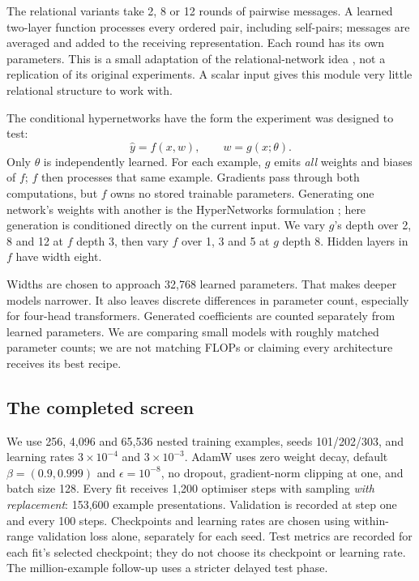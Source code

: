 \documentclass{article}
\begin{document}
The relational variants take 2, 8 or 12 rounds of pairwise messages. A learned
two-layer function processes every ordered pair, including self-pairs; messages
are averaged and added to the receiving representation. Each round has its own
parameters. This is a small adaptation of the relational-network idea
\cite{relational}, not a replication of its original experiments. A scalar input
gives this module very little relational structure to work with.

The conditional hypernetworks have the form the experiment was designed to test:
\[
  \hat y=f(x,w),\qquad w=g(x;\theta).
\]
Only $\theta$ is independently learned. For each example, $g$ emits \emph{all}
weights and biases of $f$; $f$ then processes that same example. Gradients pass
through both computations, but $f$ owns no stored trainable parameters. Generating one network's
weights with another is the HyperNetworks formulation \cite{hyper}; here generation
is conditioned directly on the current input.
We vary $g$'s depth over 2, 8 and 12 at $f$ depth 3, then vary $f$ over 1, 3 and 5
at $g$ depth 8. Hidden layers in $f$ have width eight.

Widths are chosen to approach 32,768 learned parameters. That makes deeper models
narrower. It also leaves discrete differences in parameter count, especially for
four-head transformers. Generated coefficients are counted separately from learned
parameters. We are comparing small models with roughly matched parameter counts;
we are not matching FLOPs or claiming every architecture receives its best recipe.

\subsection{The completed screen}
We use 256, 4,096 and 65,536 nested training examples, seeds 101/202/303, and learning
rates $3\times10^{-4}$ and $3\times10^{-3}$. AdamW \cite{adamw} uses zero weight
decay, default $\beta=(0.9,0.999)$ and $\epsilon=10^{-8}$, no dropout, gradient-norm
clipping at one, and batch size 128. Every fit receives 1,200 optimiser steps with
sampling \emph{with replacement}: 153,600 example presentations. Validation is
recorded at step one and every 100 steps. Checkpoints and learning rates are chosen
using within-range validation loss alone, separately for each seed. Test metrics
are recorded for each fit's selected checkpoint; they do not choose its checkpoint
or learning rate. The million-example follow-up uses a stricter delayed test phase.
\end{document}
